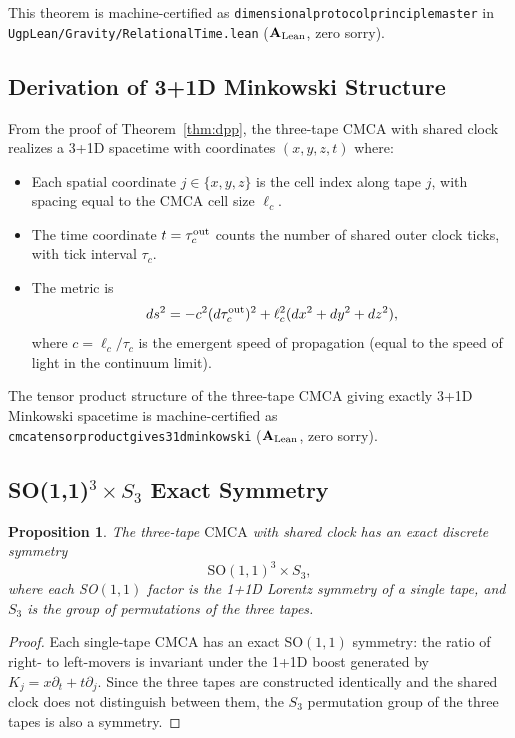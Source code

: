 \documentclass[11pt]{article}
\newtheorem{proposition}[theorem]{Proposition}
\theoremstyle{remark}
\newcommand{\lean}[1]{%
  \penalty-100
  \begingroup\def\_{\textunderscore\allowbreak}\texttt{#1}\endgroup}
\newcommand{\CatAL}{\ensuremath{\textbf{A}_{\rm Lean}}}
\newcommand{\CMCA}{\text{CMCA}}
\newcommand{\taucout}{\tau_c^{\rm out}}
\begin{document}
This theorem is machine-certified as
\lean{dimensional\_protocol\_principle\_master} in
\texttt{UgpLean/Gravity/RelationalTime.lean} ($\CatAL$, zero sorry).

\subsection{Derivation of 3+1D Minkowski Structure}

From the proof of Theorem~\ref{thm:dpp}, the three-tape $\CMCA$ with shared
clock realizes a 3+1D spacetime with coordinates $(x, y, z, t)$ where:
\begin{itemize}
  \item Each spatial coordinate $j \in \{x,y,z\}$ is the cell index along
        tape $j$, with spacing equal to the $\CMCA$ cell size $\ell_c$.
  \item The time coordinate $t = \taucout$ counts the number of shared
        outer clock ticks, with tick interval $\tau_c$.
  \item The metric is
        \[
          ds^2 = -c^2 (d\taucout)^2 + \ell_c^2(dx^2 + dy^2 + dz^2),
        \]
        where $c = \ell_c/\tau_c$ is the emergent speed of propagation
        (equal to the speed of light in the continuum limit).
\end{itemize}

The tensor product structure of the three-tape $\CMCA$ giving exactly
3+1D Minkowski spacetime is machine-certified as
\lean{cmca\_tensor\_product\_gives\_31d\_minkowski} ($\CatAL$, zero sorry).

\subsection{SO(1,1)\texorpdfstring{${}^3 \times S_3$}{3 x S3} Exact Symmetry}

\begin{proposition}
The three-tape $\CMCA$ with shared clock has an exact discrete symmetry
\[
  \text{SO}(1,1)^3 \times S_3,
\]
where each SO$(1,1)$ factor is the 1+1D Lorentz symmetry of a single tape,
and $S_3$ is the group of permutations of the three tapes.
\end{proposition}
\begin{proof}
Each single-tape $\CMCA$ has an exact SO$(1,1)$ symmetry: the ratio of right-
to left-movers is invariant under the 1+1D boost generated by
$K_j = x\partial_t + t\partial_j$. Since the three tapes are constructed
identically and the shared clock does not distinguish between them, the
$S_3$ permutation group of the three tapes is also a symmetry.
\end{proof}
\end{document}
